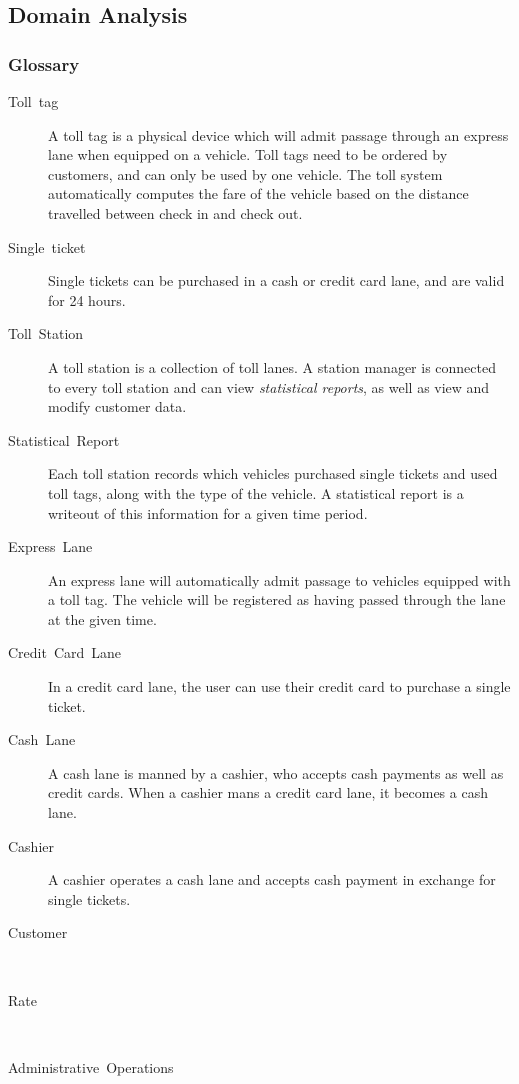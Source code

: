 \subsection {Domain Analysis}

\subsubsection {Glossary}

\begin{description}
\item [{Toll~tag}] A toll tag is a physical device which will admit passage
through an express lane when equipped on a vehicle. Toll tags need
to be ordered by customers, and can only be used by one vehicle. The
toll system automatically computes the fare of the vehicle based on
the distance travelled between check in and check out.

\item [{Single~ticket}] Single tickets can be purchased in a cash or credit
card lane, and are valid for 24 hours.

\item [{Toll~Station}] A toll station is a collection of toll lanes. A
station manager is connected to every toll station and can view \emph{statistical
reports}, as well as view and modify customer data.

\item [{Statistical~Report}] Each toll station records which vehicles
purchased single tickets and used toll tags, along with the type of
the vehicle. A statistical report is a writeout of this information
for a given time period.

\item [{Express~Lane}] An express lane will automatically admit passage
to vehicles equipped with a toll tag. The vehicle will be registered
as having passed through the lane at the given time.

\item [{Credit~Card~Lane}] In a credit card lane, the user can use their
credit card to purchase a single ticket.

\item [{Cash~Lane}] A cash lane is manned by a cashier, who accepts cash
payments as well as credit cards. When a cashier mans a credit card
lane, it becomes a cash lane.

\item [{Cashier}] A cashier operates a cash lane and accepts cash payment
in exchange for single tickets.

\item [{Customer}]~

\item [{Rate}]~

\item [{Administrative~Operations}]~
\end{description}

